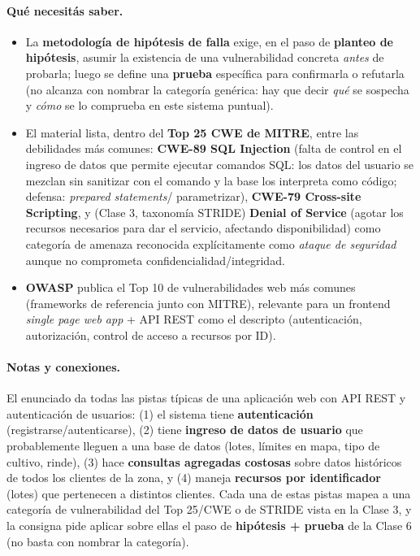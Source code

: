 \paragraph{Qué necesitás saber.}
\begin{itemize}
  \item La \textbf{metodología de hipótesis de falla} exige, en el paso de
  \textbf{planteo de hipótesis}, asumir la existencia de una vulnerabilidad concreta
  \emph{antes} de probarla; luego se define una \textbf{prueba} específica para
  confirmarla o refutarla (no alcanza con nombrar la categoría genérica: hay que decir
  \emph{qué} se sospecha y \emph{cómo} se lo comprueba en este sistema puntual).
  \item El material lista, dentro del \textbf{Top 25 CWE de MITRE}, entre las debilidades
  más comunes: \textbf{CWE-89 SQL Injection} (falta de control en el ingreso de datos que
  permite ejecutar comandos SQL: los datos del usuario se mezclan sin sanitizar con el
  comando y la base los interpreta como código; defensa: \emph{prepared statements}/
  parametrizar), \textbf{CWE-79 Cross-site Scripting}, y (Clase 3, taxonomía STRIDE)
  \textbf{Denial of Service} (agotar los recursos necesarios para dar el servicio,
  afectando disponibilidad) como categoría de amenaza reconocida explícitamente como
  \emph{ataque de seguridad} aunque no comprometa confidencialidad/integridad.
  \item \textbf{OWASP} publica el Top 10 de vulnerabilidades web más comunes (frameworks de
  referencia junto con MITRE), relevante para un frontend \emph{single page web app} +
  API REST como el descripto (autenticación, autorización, control de acceso a recursos por
  ID).
\end{itemize}

\paragraph{Notas y conexiones.}
El enunciado da todas las pistas típicas de una aplicación web con API REST y autenticación
de usuarios: (1) el sistema tiene \textbf{autenticación} (registrarse/autenticarse), (2)
tiene \textbf{ingreso de datos de usuario} que probablemente lleguen a una base de datos
(lotes, límites en mapa, tipo de cultivo, rinde), (3) hace \textbf{consultas agregadas
costosas} sobre datos históricos de todos los clientes de la zona, y (4) maneja
\textbf{recursos por identificador} (lotes) que pertenecen a distintos clientes. Cada una
de estas pistas mapea a una categoría de vulnerabilidad del Top 25/CWE o de STRIDE vista en
la Clase 3, y la consigna pide aplicar sobre ellas el paso de \textbf{hipótesis + prueba}
de la Clase 6 (no basta con nombrar la categoría).

